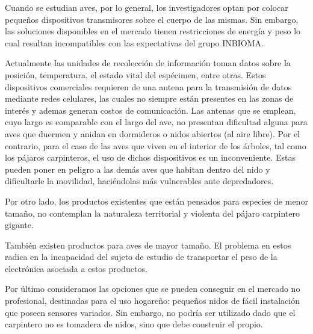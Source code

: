 %

%



Cuando se estudian aves, por lo general, los investigadores optan por colocar pequeños dispositivos transmisores sobre el cuerpo de las mismas. Sin embargo, las soluciones disponibles en el mercado tienen restricciones de energía y peso lo cual resultan incompatibles con las expectativas del grupo INBIOMA.

Actualmente las unidades de recolección de información toman datos sobre la posición, temperatura, el estado vital del espécimen, entre otras. Estos dispositivos comerciales requieren de una antena para la transmisión de datos mediante redes celulares, las cuales no siempre están presentes en las zonas de interés y ademas generan costos de comunicación. Las antenas que se emplean, cuyo largo es comparable con el largo del ave, no presentan dificultad alguna para aves que duermen y anidan en dormideros o nidos abiertos (al aire libre). Por el contrario, para el caso de las aves que viven en el interior de los árboles, tal como los pájaros carpinteros, el uso de dichos dispositivos es un inconveniente. Estas pueden poner en peligro a las demás aves que habitan dentro del nido y dificultarle la movilidad, haciéndolas más vulnerables ante depredadores.

Por otro lado, los productos existentes que están pensados para especies de menor tamaño, no contemplan la naturaleza territorial y violenta del pájaro carpintero gigante.

También existen productos para aves de mayor tamaño. El problema en estos radica en la incapacidad del sujeto de estudio de transportar el peso de la electrónica asociada a estos productos.

Por último consideramos las opciones que se pueden conseguir en el mercado no profesional, destinadas para el uso hogareño: pequeños nidos de fácil instalación que poseen sensores variados. Sin embargo, no podría ser utilizado dado que el carpintero no es tomadera de nidos, sino que debe construir el propio. 

